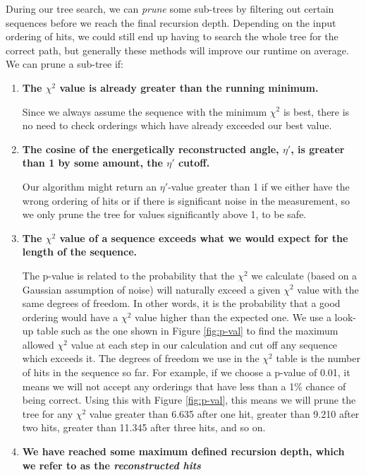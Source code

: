 During our tree search, we can \textit{prune} some sub-trees by filtering out certain sequences before we reach the final recursion depth. Depending on the input ordering of hits, we could still end up having to search the whole tree for the correct path, but generally these methods will improve our runtime on average. We can prune a sub-tree if:
\begin{enumerate}
    \item \textbf{The $\chi^2$ value is already greater than the running minimum.}
    
    Since we always assume the sequence with the minimum $\chi^2$ is best, there is no need to check orderings which have already exceeded our best value.
    
    \item \textbf{The cosine of the energetically reconstructed angle, $\eta'$, is greater than 1 by some amount, the $\eta'$ cutoff.}
    
    Our algorithm might return an $\eta'$-value greater than 1 if we either have the wrong ordering of hits or if there is significant noise in the measurement, so we only prune the tree for values significantly above 1, to be safe.
    
    \item \textbf{The $\chi^2$ value of a sequence exceeds what we would expect for the length of the sequence.}
    
    The p-value is related to the probability that the $\chi^2$ we calculate (based on a Gaussian assumption of noise) will naturally exceed a given $\chi^2$ value with the same degrees of freedom. In other words, it is the probability that a good ordering would have a $\chi^2$ value higher than the expected one. We use a look-up table such as the one shown in Figure \ref{fig:p-val} to find the maximum allowed $\chi^2$ value at each step in our calculation and cut off any sequence which exceeds it. The degrees of freedom we use in the $\chi^2$ table is the number of hits in the sequence so far. For example, if we choose a p-value of 0.01, it means we will not accept any orderings that have less than a 1\% chance of being correct. Using this with Figure \ref{fig:p-val}, this means we will prune the tree for any $\chi^2$ value greater than 6.635 after one hit, greater than 9.210 after two hits, greater than 11.345 after three hits, and so on.
    
    \pagebreak
    
    \item \textbf{We have reached some maximum defined recursion depth, which we refer to as the \textit{reconstructed hits}}
    

\end{enumerate}
